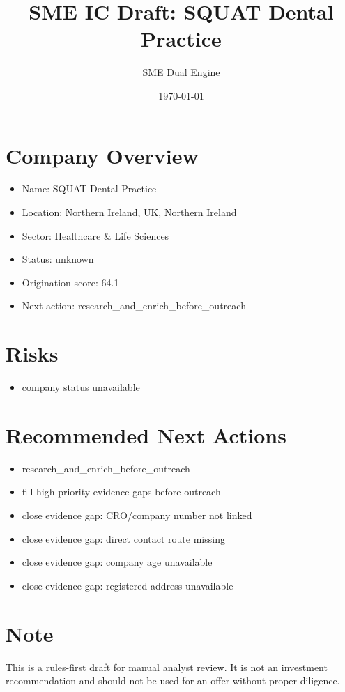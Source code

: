 \documentclass[11pt,a4paper]{article}
\title{SME IC Draft: SQUAT Dental Practice}
\author{SME Dual Engine}
\date{\today}
\begin{document}
\maketitle
\section*{Company Overview}
\begin{itemize}[leftmargin=1.4em]
\item Name: SQUAT Dental Practice
\item Location: Northern Ireland, UK, Northern Ireland
\item Sector: Healthcare \& Life Sciences
\item Status: unknown
\item Origination score: 64.1
\item Next action: research\_and\_enrich\_before\_outreach
\end{itemize}
\section*{Risks}
\begin{itemize}[leftmargin=1.4em]
\item company status unavailable
\end{itemize}
\section*{Recommended Next Actions}
\begin{itemize}[leftmargin=1.4em]
\item research\_and\_enrich\_before\_outreach
\item fill high-priority evidence gaps before outreach
\item close evidence gap: CRO/company number not linked
\item close evidence gap: direct contact route missing
\item close evidence gap: company age unavailable
\item close evidence gap: registered address unavailable
\end{itemize}
\section*{Note}
This is a rules-first draft for manual analyst review. It is not an investment
recommendation and should not be used for an offer without proper diligence.
\end{document}
